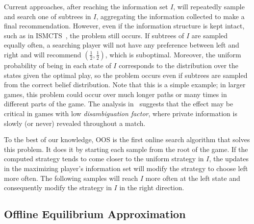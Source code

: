\documentclass{aamas2015}
\newcommand{\ttm}{\mathtt{m}}
\begin{document}
Current approaches, after reaching the information set $I$, will repeatedly sample and search one of subtrees in $I$, aggregating the information collected to make a final recommendation.
However, even if the information structure is kept intact, such as in ISMCTS~\cite{Cowling12ISMCTS}, the problem still occurs. If subtrees of $I$ are sampled equally often, a searching player will not have any preference between left and right and will recommend $(\frac{1}{2},\frac{1}{2})$, which is suboptimal.
Moreover, the uniform probability of being in each state of $I$ corresponds to the distribution over the states given the optimal play, so the problem occurs even if subtrees are sampled from the correct belief distribution. 
Note that this is a simple example; in larger games, this problem could occur over much longer paths or many times in different parts of the game.
The analysis in~\cite{Long10Understanding} suggests that the effect may be critical in games with low {\it disambiguation factor}, where private information is slowly (or never) revealed throughout a match.

To the best of our knowledge, OOS is the first online search algorithm that solves this problem.
It does it by starting each sample from the root of the game. If the computed strategy tends to come closer to the uniform strategy in $I$, the updates in the maximizing player's information set will modify the strategy to choose left more often. The following samples will reach $I$ more often at the left state and consequently modify the strategy in $I$ in the right direction.



\subsection{Offline Equilibrium Approximation}
\end{document}
